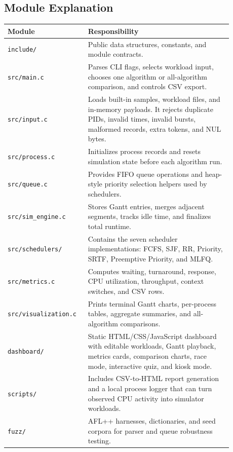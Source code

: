 \documentclass[11pt]{article}
\begin{document}
\subsection{Module Explanation}

\begin{longtable}{p{0.28\linewidth}p{0.60\linewidth}}
\toprule
\textbf{Module} & \textbf{Responsibility} \\
\midrule
\texttt{include/} & Public data structures, constants, and module contracts. \\
\texttt{src/main.c} & Parses CLI flags, selects workload input, chooses one
algorithm or all-algorithm comparison, and controls CSV export. \\
\texttt{src/input.c} & Loads built-in samples, workload files, and in-memory
payloads. It rejects duplicate PIDs, invalid times, invalid bursts, malformed
records, extra tokens, and NUL bytes. \\
\texttt{src/process.c} & Initializes process records and resets simulation
state before each algorithm run. \\
\texttt{src/queue.c} & Provides FIFO queue operations and heap-style priority
selection helpers used by schedulers. \\
\texttt{src/sim\_engine.c} & Stores Gantt entries, merges adjacent segments,
tracks idle time, and finalizes total runtime. \\
\texttt{src/schedulers/} & Contains the seven scheduler implementations:
FCFS, SJF, RR, Priority, SRTF, Preemptive Priority, and MLFQ. \\
\texttt{src/metrics.c} & Computes waiting, turnaround, response, CPU
utilization, throughput, context switches, and CSV rows. \\
\texttt{src/visualization.c} & Prints terminal Gantt charts, per-process
tables, aggregate summaries, and all-algorithm comparisons. \\
\texttt{dashboard/} & Static HTML/CSS/JavaScript dashboard with editable
workloads, Gantt playback, metrics cards, comparison charts, race mode,
interactive quiz, and kiosk mode. \\
\texttt{scripts/} & Includes CSV-to-HTML report generation and a local process
logger that can turn observed CPU activity into simulator workloads. \\
\texttt{fuzz/} & AFL++ harnesses, dictionaries, and seed corpora for parser and
queue robustness testing. \\
\bottomrule
\end{longtable}
\end{document}
